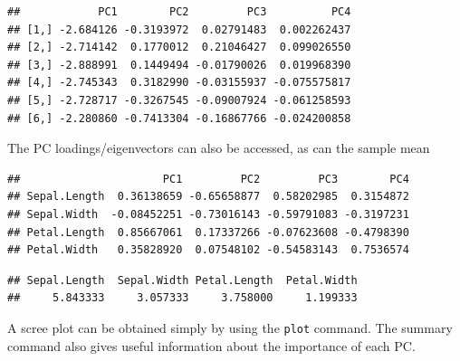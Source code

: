 \documentclass[
]{book}
\newenvironment{Shaded}{\begin{snugshade}}{\end{snugshade}}
\newcommand{\CommentTok}[1]{\textcolor[rgb]{0.56,0.35,0.01}{\textit{#1}}}
\newcommand{\FunctionTok}[1]{\textcolor[rgb]{0.00,0.00,0.00}{#1}}
\newcommand{\NormalTok}[1]{#1}
\newcommand{\SpecialCharTok}[1]{\textcolor[rgb]{0.00,0.00,0.00}{#1}}
\theoremstyle{definition}
\theoremstyle{definition}
\theoremstyle{definition}
\theoremstyle{definition}
\theoremstyle{remark}
\begin{document}
\begin{Shaded}
\end{Shaded}

\begin{verbatim}
##            PC1        PC2         PC3          PC4
## [1,] -2.684126 -0.3193972  0.02791483  0.002262437
## [2,] -2.714142  0.1770012  0.21046427  0.099026550
## [3,] -2.888991  0.1449494 -0.01790026  0.019968390
## [4,] -2.745343  0.3182990 -0.03155937 -0.075575817
## [5,] -2.728717 -0.3267545 -0.09007924 -0.061258593
## [6,] -2.280860 -0.7413304 -0.16867766 -0.024200858
\end{verbatim}

The PC loadings/eigenvectors can also be accessed, as can the sample mean

\begin{Shaded}
\end{Shaded}

\begin{verbatim}
##                      PC1         PC2         PC3        PC4
## Sepal.Length  0.36138659 -0.65658877  0.58202985  0.3154872
## Sepal.Width  -0.08452251 -0.73016143 -0.59791083 -0.3197231
## Petal.Length  0.85667061  0.17337266 -0.07623608 -0.4798390
## Petal.Width   0.35828920  0.07548102 -0.54583143  0.7536574
\end{verbatim}

\begin{Shaded}
\end{Shaded}

\begin{verbatim}
## Sepal.Length  Sepal.Width Petal.Length  Petal.Width 
##     5.843333     3.057333     3.758000     1.199333
\end{verbatim}

A scree plot can be obtained simply by using the \texttt{plot} command. The summary command also gives useful information about the importance of each PC.
\end{document}
